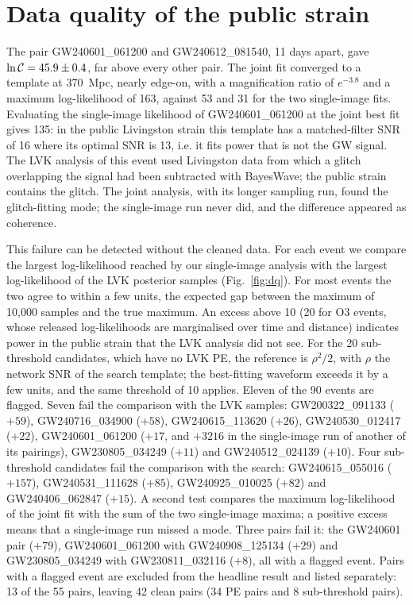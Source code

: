 \section{Data quality of the public strain}
\label{sec:dq}
The pair GW240601\_061200 and GW240612\_081540, 11 days apart, gave $\ln\mathcal C=45.9\pm0.4$, far above every other pair. The joint fit converged to a template at 370~Mpc, nearly edge-on, with a magnification ratio of $e^{-3.8}$ and a maximum log-likelihood of 163, against 53 and 31 for the two single-image fits. Evaluating the single-image likelihood of GW240601\_061200 at the joint best fit gives 135: in the public Livingston strain this template has a matched-filter SNR of 16 where its optimal SNR is 13, i.e. it fits power that is not the GW signal. The LVK analysis of this event used Livingston data from which a glitch overlapping the signal had been subtracted with BayesWave; the public strain contains the glitch. The joint analysis, with its longer sampling run, found the glitch-fitting mode; the single-image run never did, and the difference appeared as coherence.

This failure can be detected without the cleaned data. For each event we compare the largest log-likelihood reached by our single-image analysis with the largest log-likelihood of the LVK posterior samples (Fig.~\ref{fig:dq}). For most events the two agree to within a few units, the expected gap between the maximum of 10,000 samples and the true maximum. An excess above 10 (20 for O3 events, whose released log-likelihoods are marginalised over time and distance) indicates power in the public strain that the LVK analysis did not see. For the 20 sub-threshold candidates, which have no LVK PE, the reference is $\rho^2/2$, with $\rho$ the network SNR of the search template; the best-fitting waveform exceeds it by a few units, and the same threshold of 10 applies. Eleven of the 90 events are flagged. Seven fail the comparison with the LVK samples: GW200322\_091133 ($+59$), GW240716\_034900 ($+58$), GW240615\_113620 ($+26$), GW240530\_012417 ($+22$), GW240601\_061200 ($+17$, and $+3216$ in the single-image run of another of its pairings), GW230805\_034249 ($+11$) and GW240512\_024139 ($+10$). Four sub-threshold candidates fail the comparison with the search: GW240615\_055016 ($+157$), GW240531\_111628 ($+85$), GW240925\_010025 ($+82$) and GW240406\_062847 ($+15$). A second test compares the maximum log-likelihood of the joint fit with the sum of the two single-image maxima; a positive excess means that a single-image run missed a mode. Three pairs fail it: the GW240601 pair ($+79$), GW240601\_061200 with GW240908\_125134 ($+29$) and GW230805\_034249 with GW230811\_032116 ($+8$), all with a flagged event. Pairs with a flagged event are excluded from the headline result and listed separately: 13 of the 55 pairs, leaving 42 clean pairs (34 PE pairs and 8 sub-threshold pairs).

